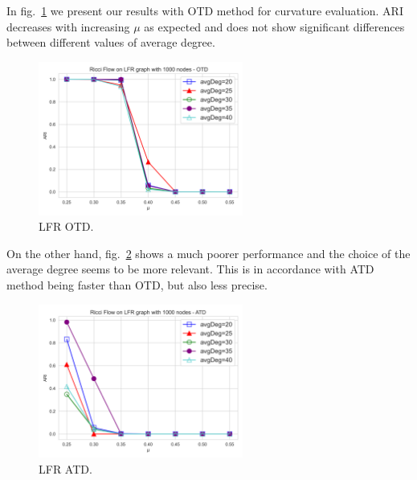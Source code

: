 In fig.~\ref{fig:LFR_OTD} we present our results with OTD method for curvature evaluation. ARI decreases with increasing $\mu$ as expected and does not show significant differences between different values of average degree.
\begin{figure}
    \centering
    \includegraphics[width=0.6\textwidth]{../tests/LFRResults/LFR_OTD.png}
    \caption{LFR OTD.}
    \label{fig:LFR_OTD}
\end{figure}

On the other hand, fig.~\ref{fig:LFR_ATD} shows a much poorer performance and the choice of the average degree seems to be more relevant. This is in accordance with ATD method being faster than OTD, but also less precise.
\begin{figure}
    \centering
    \includegraphics[width=0.6\textwidth]{../tests/LFRResults/LFR_ATD.png}
    \caption{LFR ATD.}
    \label{fig:LFR_ATD}
\end{figure}

